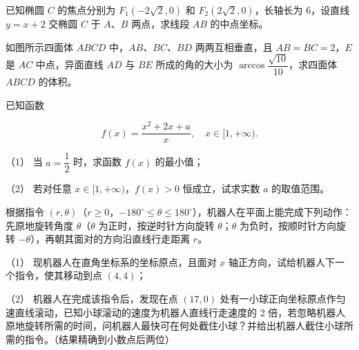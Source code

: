 \begin{question}
已知椭圆 $C$ 的焦点分别为 $F_1(-2\sqrt2,0)$ 和 $F_2(2\sqrt2,0)$，长轴长为 6，设直线 $y=x+2$ 交椭圆 $C$ 于 $A\text{、}B$ 两点，求线段 $AB$ 的中点坐标。

\Needspace{0.4\textheight}
\end{question}
\begin{question}
如图所示四面体 $ABCD$ 中，$AB$、$BC$、$BD$ 两两互相垂直，且 $AB=BC=2$，$E$ 是 $AC$ 中点，异面直线 $AD$ 与 $BE$ 所成的角的大小为 $\arccos\dfrac{\sqrt{10}}{10}$，求四面体 $ABCD$ 的体积。
\nopagebreak[4]
\begin{center}\end{center}
\nopagebreak[4]
\end{question}
\begin{question}
已知函数

\nopagebreak[4]
\[
f(x)=\dfrac{x^2+2x+a}{x},\quad x\in[1,+\infty).
\]

（1） 当 $a=\dfrac12$ 时，求函数 $f(x)$ 的最小值；

（2） 若对任意 $x\in[1,+\infty)$，$f(x)>0$ 恒成立，试求实数 $a$ 的取值范围。

\Needspace{0.4\textheight}
\end{question}
\begin{question}
根据指令 $(r,\theta)$（$r\ge0$，$-180^\circ\le\theta\le180^\circ$），机器人在平面上能完成下列动作：先原地旋转角度 $\theta$（$\theta$ 为正时，按逆时针方向旋转 $\theta$；$\theta$ 为负时，按顺时针方向旋转 $-\theta$），再朝其面对的方向沿直线行走距离 $r$。

（1） 现机器人在直角坐标系的坐标原点，且面对 $x$ 轴正方向，试给机器人下一个指令，使其移动到点 $(4,4)$；

（2） 机器人在完成该指令后，发现在点 $(17,0)$ 处有一小球正向坐标原点作匀速直线滚动，已知小球滚动的速度为机器人直线行走速度的 2 倍，若忽略机器人原地旋转所需的时间，问机器人最快可在何处截住小球？并给出机器人截住小球所需的指令。（结果精确到小数点后两位）
\nopagebreak[4]
\begin{center}\end{center}
\nopagebreak[4]
\end{question}
